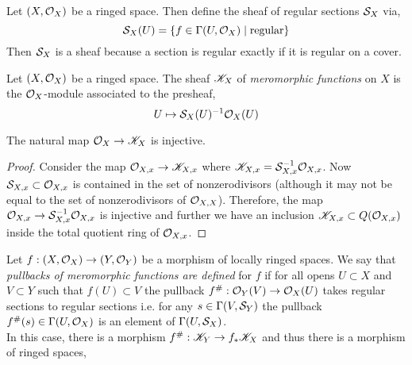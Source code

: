 \documentclass[12pt]{article}
\begin{document}
\begin{definition}
Let $(X, \struct{X})$ be a ringed space. Then define the sheaf of regular sections $\S_X$ via, 
\[ \S_X(U) = \{ f \in \Gamma(U, \struct{X}) \mid \text{regular} \} \]
Then $\S_X$ is a sheaf because a section is regular exactly if it is regular on a cover.
\end{definition}

\begin{definition}
Let $(X, \struct{X})$ be a ringed space. The sheaf $\K_X$ of \textit{meromorphic functions} on $X$ is the $\struct{X}$-module associated to the presheaf,
\[ U \mapsto \S_X(U)^{-1} \struct{X}(U) \]
\end{definition}

\begin{lemma}
The natural map $\struct{X} \to \K_X$ is injective. 
\end{lemma}

\begin{proof}
Consider the map $\stalk{X}{x} \to \K_{X,x}$ where $\K_{X,x} = \S_{X,x}^{-1} \stalk{X}{x}$.  Now $\S_{X,x} \subset \stalk{X}{x}$ is contained in the set of nonzerodivisors (although it may not be equal to the set of nonzerodivisors of $\stalk{X}{X}$). Therefore, the map $\stalk{X}{x} \to \S_{X,x}^{-1} \stalk{X}{x}$ is injective and further we have an inclusion $\K_{X,x} \subset Q(\stalk{X}{x})$ inside the total quotient ring of $\stalk{X}{x}$. 
\end{proof}

\begin{defn}
Let $f : (X, \struct{X}) \to (Y, \struct{Y})$ be a morphism of locally ringed spaces. We say that \textit{pullbacks of meromorphic functions are defined} for $f$ if for all opens $U \subset X$ and $V \subset Y$ such that $f(U) \subset V$ the pullback $f^\# : \struct{Y}(V) \to \struct{X}(U)$ takes regular sections to regular sections i.e. for any $s \in \Gamma(V, \S_Y)$ the pullback $f^\#(s) \in \Gamma(U, \struct{X})$ is an element of $\Gamma(U, \S_X)$.
\bigskip\\
In this case, there is a morphism $f^\# : \K_Y \to f_* \K_X$ and thus there is a morphism of ringed spaces,
\begin{center}
\end{center}
\end{defn}
\end{document}
